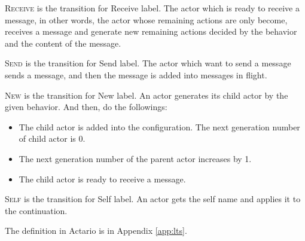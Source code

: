 \begin{description}[style=nextline,leftmargin=12pt,parsep=0pt]
\item[\textsc{Receive}]
  \textsc{Receive} is the transition for \textsf{Receive} label.
  The actor which is ready to receive a message, in other words, the actor whose remaining actions are only \textsf{become}, receives a message and generate new remaining actions decided by the behavior and the content of the message.
\item[\textsc{Send}]
  \textsc{Send} is the transition for \textsf{Send} label.
  The actor which want to send a message sends a message, and then the message is added into messages in flight.
\item[\textsc{New}]
  \textsc{New} is the transition for \textsf{New} label.
  An actor generates its child actor by the given behavior.
  And then, do the followings:
  \begin{itemize}
  \item The child actor is added into the configuration. The next generation number of child actor is 0.
  \item The next generation number of the parent actor increases by 1.
  \item The child actor is ready to receive a message.
  \end{itemize}
\item[\textsc{Self}]
  \textsc{Self} is the transition for \textsf{Self} label.
  An actor gets the self name and applies it to the continuation.
\end{description}

The definition in Actario is in Appendix \ref{app:lts}.


